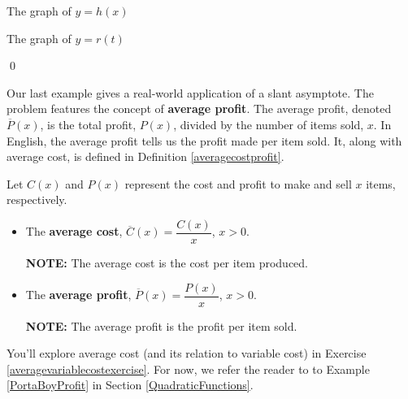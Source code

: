 \begin{ex}
\begin{enumerate}
\begin{mfigure}


\caption{The graph of $y=h(x)$}
\label{fig:yeqhxeqxcubedetc}
\end{mfigure}

\begin{mfigure}
  

\caption{The graph of $y=r(t)$}
\label{fig:yeqrteqtwotetc}
\end{mfigure}

\qed

\end{enumerate}

\end{ex}

Our last example gives a real-world application of a slant asymptote. The problem features the concept of \textbf{average profit}. The average profit, denoted $\overline{P}(x)$,  is the total profit, $P(x)$,  divided by the number of items sold, $x$. In English, the average profit tells us the profit made per item sold. It, along with average cost, is defined in Definition \ref{averagecostprofit}.

\begin{mdefn} \label{averagecostprofit} Let $C(x)$ and $P(x)$ represent the cost and profit to make and sell $x$ items, respectively.

\begin{itemize}

\item    The  \textbf{average cost}, $\overline{C}(x) = \dfrac{C(x)}{x}$, $x > 0$.  

\textbf{NOTE:}  The average cost is the cost per item produced.

\item   The  \textbf{average profit}, $\overline{P}(x) = \dfrac{P(x)}{x}$, $x > 0$.  

\textbf{NOTE:}  The average profit is the profit  per item sold.

\end{itemize}

\end{mdefn}

You'll explore average cost (and its relation to variable cost) in Exercise \ref{averagevariablecostexercise}.  For now, we refer the reader to to Example \ref{PortaBoyProfit}  in Section \ref{QuadraticFunctions}.

